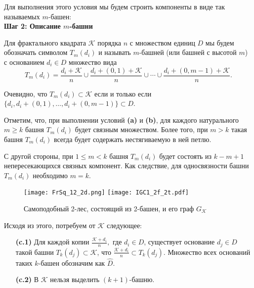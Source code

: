 Для выполнения этого условия мы будем строить компоненты в виде так называемых $m$-башен:\\


\textbf{Шаг 2: Описание $m$-башни}

\begin{definition}
Для фрактального квадрата ${\mathcal{K}}$ порядка $n$ с множеством единиц $D$ мы будем обозначать символом $T_m(d_i)$ и называть $m$-башней (или башней с высотой $m$) с основанием $d_i\in D$ множество вида
$$T_m(d_i)=\frac{d_i+\mathcal{K}}{n}\cup\frac{d_i+(0,1)+\mathcal{K}}{n}\cup\cdots\cup\frac{d_i+(0,m-1)+\mathcal{K}}{n}.$$
\end{definition}
Очевидно, что $T_m(d_i)\subset{\mathcal{K}}$ если и только если $\{d_i, d_i+(0,1), \ldots, d_i+(0,m-1)\}\subset D$.

Отметим, что, при выполнении условий {\bf(a)} и {\bf(b)}, для каждого натурального $m\geq k$ башня $T_m(d_i)$ будет связным множеством.
Более того, при $m>k$ такая башня $T_m(d_i)$ всегда будет содержать нестягиваемую в ней петлю.

С другой стороны, при $1\leq m<k$ башня $T_m(d_i)$ будет состоять из $k-m+1$ непересекающихся связных компонент.
Как следствие, для односвязности башни $T_m(d_i)$ необходимо $m=k$.

\begin{figure}[h]
\texttt{[image: FrSq\_12\_2d.png]}
\hfill
\texttt{[image: IGC1\_2f\_2t.pdf]}
\caption{Самоподобный 2-лес, состоящий из 2-башен, и его граф $G_{\mathcal{K}}$}
\label{fig:2forest}
\end{figure}

Исходя из этого, потребуем от ${\mathcal{K}}$ следующее:
\begin{itemize}
\item[{\bf(c.1)}] Для каждой копии $\frac{{\mathcal{K}}+d_i}{n},$ где $d_i\in D$, существует основание $d_j\in D$ такой башни $T_k(d_j)\subset{\mathcal{K}}$, что $\frac{{\mathcal{K}}+d_i}{n}\subset T_k(d_j)$. Множество всех оснований таких $k$-башен обозначим как $\hat D$.
\item[{\bf(c.2)}] В ${\mathcal{K}}$ нельзя выделить $(k+1)$-башню.
\end{itemize}

